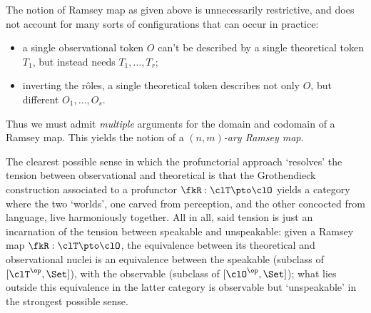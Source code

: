 \begin{remark}\label{multiramsey}
	The notion of Ramsey map as given above is unnecessarily restrictive, and does not account for many sorts of configurations that can occur in practice:
	\begin{itemize}
		\item a single observational token $O$ can't be described by a single theoretical token $T_1$, but instead needs $T_1,\dots,T_r$;
		\item inverting the r\^oles, a single theoretical token describes not only $O$, but different $O_1,\dots,O_s$.
	\end{itemize}
	Thus we must admit \emph{multiple} arguments for the domain and codomain of a Ramsey map. This yields the notion of a \emph{$(n,m)$-ary Ramsey map}.
\end{remark}
\begin{remark}\label{resoudre_la_tension}
	The clearest possible sense in which the profunctorial approach `resolves' the tension between observational and theoretical is that the Gro\-then\-dieck construction associated to a profunctor $\fkR : \clT \pto \clO$ yields a category where the two `worlds', one carved from perception, and the other concocted from language, live harmoniously together. All in all, said tension is just an incarnation of the tension between speakable and unspeakable: given a Ramsey map $\fkR : \clT \pto \clO$, the equivalence between its theoretical and observational nuclei is an equivalence between the speakable (subclass of $[\clT^\op,\Set]$), with the observable (subclass of $[\clO^\op,\Set]$); what lies outside this equivalence in the latter category is observable but `unspeakable' in the strongest possible sense.
\end{remark}
